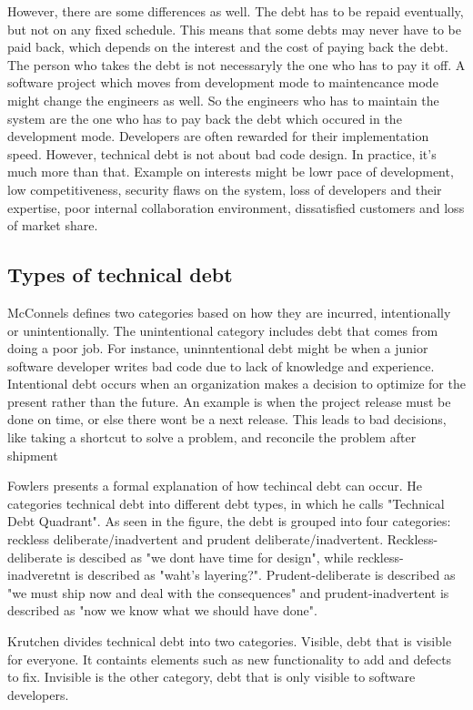 However, there are some differences as well. The debt has to be repaid eventually, but not on any fixed schedule. This means that some debts may never have to be paid back, which depends on the interest and the cost of paying back the debt. The person who takes the debt is not necessaryly the one who has to pay it off. A software project which moves from development mode to maintencance mode might change the engineers as well. So the engineers who has to maintain the system are the one who has to pay back the debt which occured in the development mode. Developers are often rewarded for their implementation speed. However, technical debt is not about bad code design. In practice, it's much more than that. Example on interests might be lowr pace of development, low competitiveness, security flaws on the system, loss of developers and their expertise, poor internal collaboration environment, dissatisfied customers and loss of market share. 



\subsection{Types of technical debt}

McConnels defines two categories based on how they are incurred, intentionally or unintentionally. The unintentional category includes debt that comes from doing a poor job. For instance, uninntentional debt might be when a junior software developer writes bad code due to lack of knowledge and experience. Intentional debt occurs when an organization makes a decision to optimize for the present rather than the future. An example is when the project release must be done on time, or else there wont be a next release. This leads to bad decisions, like taking a shortcut to solve a problem, and reconcile the problem after shipment

Fowlers presents a formal explanation of how techincal debt can occur. He categories technical debt into different debt types, in which he calls "Technical Debt Quadrant". As seen in the figure, the debt is grouped into four categories: reckless deliberate/inadvertent and prudent deliberate/inadvertent. Reckless-deliberate is descibed as "we dont have time for design", while reckless-inadveretnt is described as "waht's layering?". Prudent-deliberate is described as "we must ship now and deal with the consequences" and prudent-inadvertent is described as "now we know what we should have done". 

Krutchen divides technical debt into two categories. Visible, debt that is visible for everyone. It containts elements such as new functionality to add and defects to fix. Invisible is the other category, debt that is only visible to software developers.

